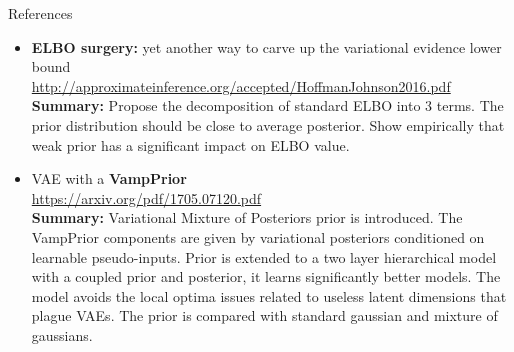 \documentclass{beamer}
\begin{document}
\begin{frame}{References}
{\begin{itemize}
	\item \textbf{ELBO surgery:} yet another way to carve up the variational evidence lower bound \\
	\href{http://approximateinference.org/accepted/HoffmanJohnson2016.pdf}{http://approximateinference.org/accepted/HoffmanJohnson2016.pdf} \\
	\textbf{Summary:} Propose the decomposition of standard ELBO into 3 terms. The prior distribution should be close to average posterior. Show empirically that weak prior has a significant impact on ELBO value.
	
	\item VAE with a \textbf{VampPrior} \\
	\href{https://arxiv.org/pdf/1705.07120.pdf}{https://arxiv.org/pdf/1705.07120.pdf} \\
	\textbf{Summary:} Variational Mixture of Posteriors prior is introduced. The VampPrior components are given by variational posteriors conditioned on learnable pseudo-inputs. Prior is extended to a two layer hierarchical model with a coupled prior and posterior, it learns significantly better models. The model avoids the local optima issues related to useless latent dimensions that plague VAEs. The prior is compared with standard gaussian and mixture of gaussians.
\end{itemize}
}
\end{frame}
\end{document}
